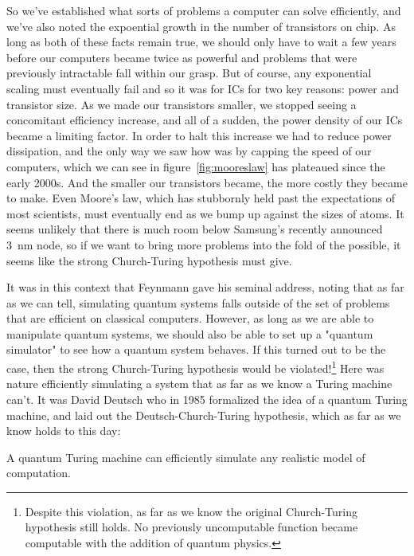 So we've established what sorts of problems a computer can solve efficiently, and we've also noted the
expoential growth in the number of transistors on chip. As long as both of these facts remain true, we
should only have to wait a few years before our computers became twice as powerful and problems that were
previously intractable fall within our grasp. But of course, any exponential scaling must eventually fail
and so it was for ICs for two key reasons: power and transistor size. As we made our transistors smaller,
we stopped seeing a concomitant efficiency increase, and all of a sudden, the power density of our ICs 
became a limiting factor. In order to halt this increase we had to reduce power dissipation, and the
only way we saw how was by capping the speed of our computers, which we can see in figure~\ref{fig:mooreslaw}
has plateaued since the early 2000s. And the smaller our transistors became, the more costly they became 
to make. Even Moore's law, which has stubbornly held past the expectations of most scientists, must eventually
end as we bump up against the sizes of atoms. It seems unlikely that there is much room below Samsung's 
recently announced \SI{3}{\nano\meter} node, so if we want to bring more problems into the fold of the
possible, it seems like the strong Church-Turing hypothesis must give.

It was in this context that Feynmann gave his seminal address, noting that as far as we can tell, simulating
quantum systems falls outside of the set of problems that are efficient on classical computers\cite{Feynman1982}. 
However, as long as we are able to manipulate quantum systems, we should also be able to set up a "quantum
simulator" to see how a quantum system behaves. If this turned out to be the case, then the strong 
Church-Turing hypothesis would be violated!\footnote{Despite this violation, as far as we know the original
Church-Turing hypothesis still holds. No previously uncomputable function became computable with the addition
of quantum physics.} Here was nature efficiently simulating a system that as far as we know a Turing machine 
can't. It was David Deutsch who in 1985 formalized the idea of a quantum Turing machine\cite{doi:10.1098/rspa.1985.0070}, 
and laid out the Deutsch-Church-Turing hypothesis, which as far as we know holds to this day:

\begin{displayquote}
  A quantum Turing machine can efficiently simulate any realistic model of computation.
\end{displayquote}

